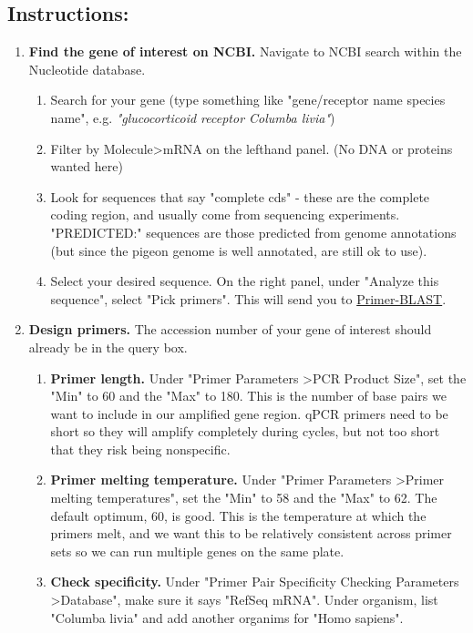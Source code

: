 \documentclass[a4paper,12pt,twoside]{book}
\begin{document}
 \subsection*{Instructions:}
\begin{enumerate}
	\item {\bf Find the gene of interest on NCBI.} Navigate to NCBI search within the Nucleotide database. 
	\begin{enumerate}
		\item Search for your gene (type something like "gene/receptor name species name", e.g. {\em "glucocorticoid receptor Columba livia"})
		\item Filter by Molecule\textgreater mRNA on the lefthand panel. (No DNA or proteins wanted here)
		\item Look for sequences that say "complete cds" - these are the complete coding region, and usually come from sequencing experiments. "PREDICTED:" sequences are those predicted from genome annotations (but since the pigeon genome is well annotated, are still ok to use). 
		\item Select your desired sequence. On the right panel, under "Analyze this sequence", select "Pick primers". This will send you to \href{https://www.ncbi.nlm.nih.gov/tools/primer-blast/}{Primer-BLAST}. 
	\end{enumerate}
\item {\bf Design primers.}  The accession number of your gene of interest should already be in the query box. 
\begin{enumerate}
	\item {\bf Primer length.} Under "Primer Parameters \textgreater PCR Product Size", set the "Min" to 60 and the "Max" to 180. 
	\subitem This is the number of base pairs we want to include in our amplified gene region. qPCR primers need to be short so they will amplify completely during cycles, but not too short that they risk being nonspecific. 
	\item {\bf Primer melting temperature.} Under "Primer Parameters \textgreater Primer melting temperatures", set the "Min" to 58 and the "Max" to 62. The default optimum, 60, is good.  
	\subitem This is the temperature at which the primers melt, and we want this to be relatively consistent across primer sets so we can run multiple genes on the same plate.
	\item {\bf Check specificity.} Under "Primer Pair Specificity Checking Parameters \textgreater Database", make sure it says "RefSeq mRNA". Under organism, list "Columba livia" and add another organims for "Homo sapiens". 

\end{enumerate}
\end{enumerate}
\end{document}
